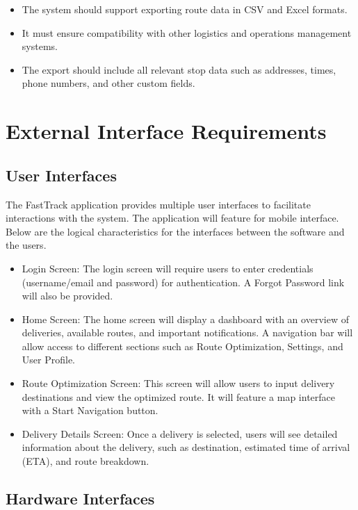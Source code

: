 \begin{itemize}
    \item The system should support exporting route data in CSV and Excel formats.
    \item It must ensure compatibility with other logistics and operations management systems.
    \item The export should include all relevant stop data such as addresses, times, phone numbers, and other custom fields.
\end{itemize}

\section{External Interface Requirements}
\subsection{User Interfaces}

The FastTrack application provides multiple user interfaces to facilitate interactions with the system. The application will feature for mobile interface. Below are the logical characteristics for the interfaces between the software and the users.
\begin{itemize}
    \item Login Screen: The login screen will require users to enter credentials (username/email and password) for authentication. A Forgot Password link will also be provided.
    \item Home Screen: The home screen will display a dashboard with an overview of deliveries, available routes, and important notifications. A navigation bar will allow access to different sections such as Route Optimization, Settings, and User Profile.
    \item Route Optimization Screen: This screen will allow users to input delivery destinations and view the optimized route. It will feature a map interface with a Start Navigation button.
    \item Delivery Details Screen: Once a delivery is selected, users will see detailed information about the delivery, such as destination, estimated time of arrival (ETA), and route breakdown.
\end{itemize}

\subsection{Hardware Interfaces}

